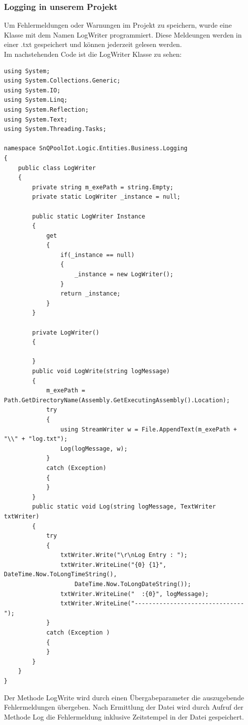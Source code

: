 \subsubsection{Logging in unserem Projekt}
Um Fehlermeldungen oder Warnungen im Projekt zu speichern, wurde eine Klasse mit dem Namen LogWriter programmiert.
Diese Meldeungen werden in einer .txt gespeichert und können jederzeit gelesen werden.
\\Im nachstehenden Code ist die LogWriter Klasse zu sehen:
\\
\begin{lstlisting}
using System;
using System.Collections.Generic;
using System.IO;
using System.Linq;
using System.Reflection;
using System.Text;
using System.Threading.Tasks;

namespace SnQPoolIot.Logic.Entities.Business.Logging
{
    public class LogWriter
    {
        private string m_exePath = string.Empty;
        private static LogWriter _instance = null;

        public static LogWriter Instance
        {
            get
            {
                if(_instance == null)
                {
                    _instance = new LogWriter();
                }
                return _instance;
            }
        }

        private LogWriter()
        {

        }
        public void LogWrite(string logMessage)
        {
            m_exePath = Path.GetDirectoryName(Assembly.GetExecutingAssembly().Location);
            try
            {
                using StreamWriter w = File.AppendText(m_exePath + "\\" + "log.txt");
                Log(logMessage, w);
            }
            catch (Exception)
            {
            }
        }
        public static void Log(string logMessage, TextWriter txtWriter)
        {
            try
            {
                txtWriter.Write("\r\nLog Entry : ");
                txtWriter.WriteLine("{0} {1}", DateTime.Now.ToLongTimeString(),
                    DateTime.Now.ToLongDateString());
                txtWriter.WriteLine("  :{0}", logMessage);
                txtWriter.WriteLine("-------------------------------");
            }
            catch (Exception )
            {
            }
        }
    }
}
\end{lstlisting}

Der Methode LogWrite wird durch einen Übergabeparameter die auszugebende Fehlermeldungen übergeben. Nach Ermittlung der Datei wird durch Aufruf der Methode Log 
die Fehlermeldung inklusive Zeitstempel in der Datei gespeichert.
\\
\\

